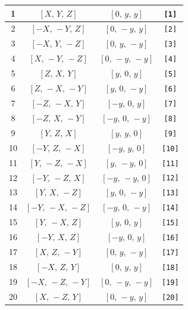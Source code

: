 \documentclass[fleqn,8pt]{jsarticle}
\begin{document}
\begin{longtable}{cccc}
1 & $\left[ X,\, Y,\, Z \right]$ & $\left[ 0,\, y,\, y \right]$ & {\tt [1]} \\ \hline
2 & $\left[ - X,\, - Y,\, Z \right]$ & $\left[ 0,\, - y,\, y \right]$ & {\tt [2]} \\ \hline
3 & $\left[ - X,\, Y,\, - Z \right]$ & $\left[ 0,\, y,\, - y \right]$ & {\tt [3]} \\ \hline
4 & $\left[ X,\, - Y,\, - Z \right]$ & $\left[ 0,\, - y,\, - y \right]$ & {\tt [4]} \\ \hline
5 & $\left[ Z,\, X,\, Y \right]$ & $\left[ y,\, 0,\, y \right]$ & {\tt [5]} \\ \hline
6 & $\left[ Z,\, - X,\, - Y \right]$ & $\left[ y,\, 0,\, - y \right]$ & {\tt [6]} \\ \hline
7 & $\left[ - Z,\, - X,\, Y \right]$ & $\left[ - y,\, 0,\, y \right]$ & {\tt [7]} \\ \hline
8 & $\left[ - Z,\, X,\, - Y \right]$ & $\left[ - y,\, 0,\, - y \right]$ & {\tt [8]} \\ \hline
9 & $\left[ Y,\, Z,\, X \right]$ & $\left[ y,\, y,\, 0 \right]$ & {\tt [9]} \\ \hline
10 & $\left[ - Y,\, Z,\, - X \right]$ & $\left[ - y,\, y,\, 0 \right]$ & {\tt [10]} \\ \hline
11 & $\left[ Y,\, - Z,\, - X \right]$ & $\left[ y,\, - y,\, 0 \right]$ & {\tt [11]} \\ \hline
12 & $\left[ - Y,\, - Z,\, X \right]$ & $\left[ - y,\, - y,\, 0 \right]$ & {\tt [12]} \\ \hline
13 & $\left[ Y,\, X,\, - Z \right]$ & $\left[ y,\, 0,\, - y \right]$ & {\tt [13]} \\ \hline
14 & $\left[ - Y,\, - X,\, - Z \right]$ & $\left[ - y,\, 0,\, - y \right]$ & {\tt [14]} \\ \hline
15 & $\left[ Y,\, - X,\, Z \right]$ & $\left[ y,\, 0,\, y \right]$ & {\tt [15]} \\ \hline
16 & $\left[ - Y,\, X,\, Z \right]$ & $\left[ - y,\, 0,\, y \right]$ & {\tt [16]} \\ \hline
17 & $\left[ X,\, Z,\, - Y \right]$ & $\left[ 0,\, y,\, - y \right]$ & {\tt [17]} \\ \hline
18 & $\left[ - X,\, Z,\, Y \right]$ & $\left[ 0,\, y,\, y \right]$ & {\tt [18]} \\ \hline
19 & $\left[ - X,\, - Z,\, - Y \right]$ & $\left[ 0,\, - y,\, - y \right]$ & {\tt [19]} \\ \hline
20 & $\left[ X,\, - Z,\, Y \right]$ & $\left[ 0,\, - y,\, y \right]$ & {\tt [20]} \\ \hline

\end{longtable}
\end{document}

